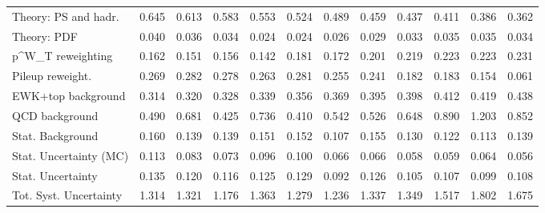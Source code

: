 \begin{tabular}{l|p{0.6cm}p{0.6cm}p{0.6cm}p{0.6cm}p{0.6cm}p{0.6cm}p{0.6cm}p{0.6cm}p{0.6cm}p{0.6cm}p{0.6cm}}
Theory: PS and hadr.                     & 0.645 & 0.613 & 0.583 & 0.553 & 0.524 & 0.489 & 0.459 & 0.437 & 0.411 & 0.386 & 0.362 \\
Theory: PDF                              & 0.040 & 0.036 & 0.034 & 0.024 & 0.024 & 0.026 & 0.029 & 0.033 & 0.035 & 0.035 & 0.034 \\
p^{W}_{T} reweighting                    & 0.162 & 0.151 & 0.156 & 0.142 & 0.181 & 0.172 & 0.201 & 0.219 & 0.223 & 0.223 & 0.231 \\
Pileup reweight.                         & 0.269 & 0.282 & 0.278 & 0.263 & 0.281 & 0.255 & 0.241 & 0.182 & 0.183 & 0.154 & 0.061 \\
EWK+top background                       & 0.314 & 0.320 & 0.328 & 0.339 & 0.356 & 0.369 & 0.395 & 0.398 & 0.412 & 0.419 & 0.438 \\
QCD background                           & 0.490 & 0.681 & 0.425 & 0.736 & 0.410 & 0.542 & 0.526 & 0.648 & 0.890 & 1.203 & 0.852 \\
Stat. Background                         & 0.160 & 0.139 & 0.139 & 0.151 & 0.152 & 0.107 & 0.155 & 0.130 & 0.122 & 0.113 & 0.139 \\
Stat. Uncertainty (MC)                   & 0.113 & 0.083 & 0.073 & 0.096 & 0.100 & 0.066 & 0.066 & 0.058 & 0.059 & 0.064 & 0.056 \\
\hline
Stat. Uncertainty                        & 0.135 & 0.120 & 0.116 & 0.125 & 0.129 & 0.092 & 0.126 & 0.105 & 0.107 & 0.099 & 0.108 \\
\hline
Tot. Syst. Uncertainty                   & 1.314 & 1.321 & 1.176 & 1.363 & 1.279 & 1.236 & 1.337 & 1.349 & 1.517 & 1.802 & 1.675 \\
\hline
\end{tabular}
